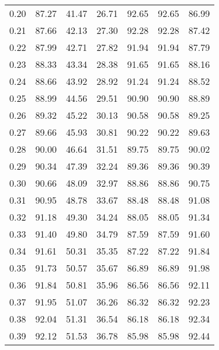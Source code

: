 \begin{tabular}{|c|c|c|c|c|c|c|}
      0.20 &     87.27 &     41.47 &      26.71 &   92.65 &      92.65 &         86.99 \\
      0.21 &     87.66 &     42.13 &      27.30 &   92.28 &      92.28 &         87.42 \\
      0.22 &     87.99 &     42.71 &      27.82 &   91.94 &      91.94 &         87.79 \\
      0.23 &     88.33 &     43.34 &      28.38 &   91.65 &      91.65 &         88.16 \\
      0.24 &     88.66 &     43.92 &      28.92 &   91.24 &      91.24 &         88.52 \\
      0.25 &     88.99 &     44.56 &      29.51 &   90.90 &      90.90 &         88.89 \\
      0.26 &     89.32 &     45.22 &      30.13 &   90.58 &      90.58 &         89.25 \\
      0.27 &     89.66 &     45.93 &      30.81 &   90.22 &      90.22 &         89.63 \\
      0.28 &     90.00 &     46.64 &      31.51 &   89.75 &      89.75 &         90.02 \\
      0.29 &     90.34 &     47.39 &      32.24 &   89.36 &      89.36 &         90.39 \\
      0.30 &     90.66 &     48.09 &      32.97 &   88.86 &      88.86 &         90.75 \\
      0.31 &     90.95 &     48.78 &      33.67 &   88.48 &      88.48 &         91.08 \\
      0.32 &     91.18 &     49.30 &      34.24 &   88.05 &      88.05 &         91.34 \\
      0.33 &     91.40 &     49.80 &      34.79 &   87.59 &      87.59 &         91.60 \\
      0.34 &     91.61 &     50.31 &      35.35 &   87.22 &      87.22 &         91.84 \\
      0.35 &     91.73 &     50.57 &      35.67 &   86.89 &      86.89 &         91.98 \\
      0.36 &     91.84 &     50.81 &      35.96 &   86.56 &      86.56 &         92.11 \\
      0.37 &     91.95 &     51.07 &      36.26 &   86.32 &      86.32 &         92.23 \\
      0.38 &     92.04 &     51.31 &      36.54 &   86.18 &      86.18 &         92.34 \\
      0.39 &     92.12 &     51.53 &      36.78 &   85.98 &      85.98 &         92.44 \\

\end{tabular}
